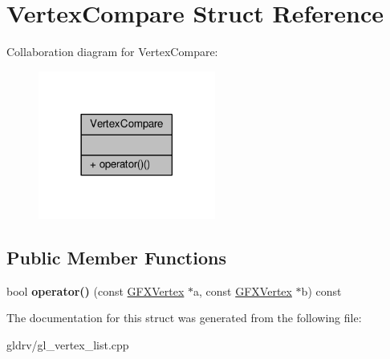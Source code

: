 \hypertarget{structVertexCompare}{}\section{Vertex\+Compare Struct Reference}
\label{structVertexCompare}


Collaboration diagram for Vertex\+Compare\+:
\nopagebreak
\begin{figure}[H]
\begin{center}
\leavevmode
\includegraphics[width=165pt]{db/d4b/structVertexCompare__coll__graph}
\end{center}
\end{figure}
\subsection*{Public Member Functions}
\begin{DoxyCompactItemize}
\item 
bool {\bfseries operator()} (const \hyperlink{structGFXVertex}{G\+F\+X\+Vertex} $\ast$a, const \hyperlink{structGFXVertex}{G\+F\+X\+Vertex} $\ast$b) const \hypertarget{structVertexCompare_a1f49cbce96d2538cb7b21514dc98cf65}{}\label{structVertexCompare_a1f49cbce96d2538cb7b21514dc98cf65}

\end{DoxyCompactItemize}


The documentation for this struct was generated from the following file\+:\begin{DoxyCompactItemize}
\item 
gldrv/gl\+\_\+vertex\+\_\+list.\+cpp\end{DoxyCompactItemize}
